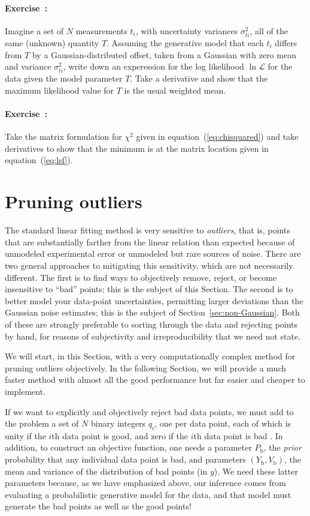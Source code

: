 \documentclass[12pt,twoside]{article}
\newcommand{\sectionname}{Section}
\newcommand{\equationname}{equation}
\newcommand{\problemname}{Exercise}
\newcounter{problem}
\newenvironment{problem}{\paragraph{\problemname~\theproblem:}\refstepcounter{problem}}{}
\newcommand{\like}{\mathscr{L}}
\newcommand{\Pbad}{P_{\mathrm{b}}}
\newcommand{\Ybad}{Y_{\mathrm{b}}}
\newcommand{\Vbad}{V_{\mathrm{b}}}
\begin{document}
\begin{problem}
Imagine a set of $N$ measurements $t_i$, with uncertainty variances
$\sigma_{ti}^2$, all of the same (unknown) quantity $T$.  Assuming the
generative model that each $t_i$ differs from $T$ by a
Gaussian-distributed offset, taken from a Gaussian with zero mean and
variance $\sigma_{ti}^2$, write down an experession for the log
likelihood $\ln\like$ for the data given the model parameter $T$.
Take a derivative and show that the maximum likelihood value for $T$
is the usual weighted mean.
\end{problem}

\begin{problem}
Take the matrix formulation for $\chi^2$ given in
\equationname~(\ref{eq:chisquared}) and take derivatives to show that
the minimum is at the matrix location given in
\equationname~(\ref{eq:lsf}).
\end{problem}

\section{Pruning outliers}\label{sec:outliers}

The standard linear fitting method is very sensitive to
\emph{outliers}, that is, points that are substantially farther from
the linear relation than expected because of unmodeled experimental
error or unmodeled but rare sources of noise.  There are two general
approaches to mitigating this sensitivity, which are not necessarily
different.  The first is to find ways to objectively remove, reject,
or become insensitive to ``bad'' points; this is the subject of this
\sectionname.  The second is to better model your data-point
uncertainties, permitting larger deviations than the Gaussian noise
estimates; this is the subject of \sectionname~\ref{sec:non-Gaussian}.
Both of these are strongly preferable to sorting through the data and
rejecting points by hand, for reasons of subjectivity and
irreproducibility that we need not state.

We will start, in this \sectionname, with a very computationally
complex method for pruning outliers objectively.  In the following
\sectionname, we will provide a much faster method with almost all the
good performance but far easier and cheaper to implement.

If we want to explicitly and objectively reject bad data points, we
must add to the problem a set of $N$ binary integers $q_i$, one per
data point, each of which is unity if the $i$th data point is good,
and zero if the $i$th data point is bad \citep{pressH0,jaynes}.  In
addition, to construct an objective function, one needs a parameter
$\Pbad$, the \emph{prior} probability that any individual data point
is bad, and parameters $(\Ybad,\Vbad)$, the mean and variance of the
distribution of bad points (in $y$).  We need these latter parameters
because, as we have emphasized above, our inference comes from
evaluating a probabilistic generative model for the data, and that
model must generate the bad points as well as the good points!
\end{document}
